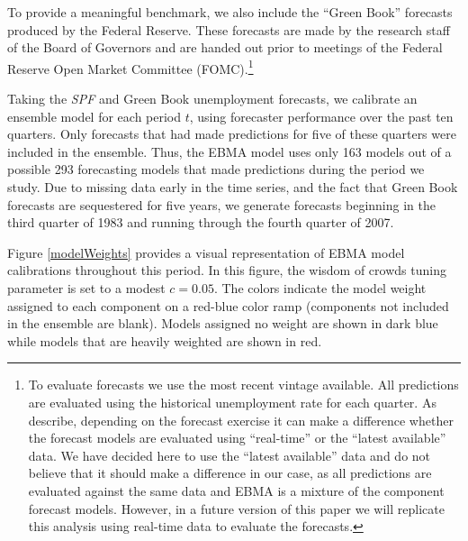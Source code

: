 \documentclass[12pt,fullpage,endnotes]{article}
\begin{document}
To provide a meaningful benchmark, we also include the ``Green Book''
forecasts produced by the Federal Reserve. These forecasts are made by
the research staff of the Board of Governors and are handed out prior
to meetings of the Federal Reserve Open Market Committee
(FOMC).\footnote{To evaluate forecasts we use the most recent vintage
  available. All predictions are evaluated using the historical
  unemployment rate for each quarter. As \citet{Croushore:Stark:2001}
  describe, depending on the forecast exercise it can make a
  difference whether the forecast models are evaluated using
  ``real-time'' or the ``latest available'' data. We have decided here
  to use the ``latest available'' data and do not believe that it
  should make a difference in our case, as all predictions are
  evaluated against the same data and EBMA is a mixture of the
  component forecast models. However, in a future version of this
  paper we will replicate this analysis using real-time data to
  evaluate the forecasts.} %

Taking the \textit{SPF} and Green Book unemployment forecasts, we
calibrate an ensemble model for each period $t$, using forecaster
performance over the past ten quarters.  Only forecasts that had made
predictions for five of these quarters were included in the ensemble.
Thus, the EBMA model uses only 163 models out of a possible 293
forecasting models that made predictions during the period we study.
Due to missing data early in the time series, and the fact that Green
Book forecasts are sequestered for five years, we generate forecasts
beginning in the third quarter of 1983 and running through the fourth
quarter of 2007.

Figure \ref{modelWeights} provides a visual representation of EBMA
model calibrations throughout this period.  In this figure, the wisdom
of crowds tuning parameter is set to a modest $c=0.05$.  The colors
indicate the model weight assigned to each component on a red-blue
color ramp (components not included in the ensemble are blank).
Models assigned no weight are shown in dark blue while models that are
heavily weighted are shown in red.
\end{document}
